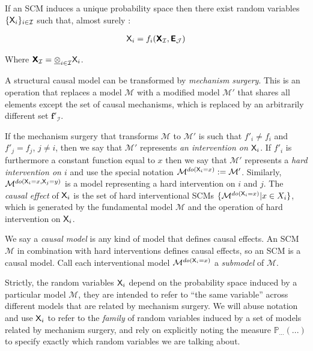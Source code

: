 If an SCM induces a unique probability space then there exist random variables $\{\mathsf{X}_i\}_{i\in\mathcal{I}}$ such that, almost surely \citet{bongers_theoretical_2016}:

\begin{align}
	\mathsf{X}_i = f_i(\bm{\mathsf{X}}_{\mathcal{I}},\bm{\mathsf{E}}_{\mathcal{J}})
\end{align}

Where $\bm{\mathsf{X}}_{\mathcal{I}} = \underline{\otimes}_{i\in \mathcal{I}} \mathsf{X}_i$.

A structural causal model can be transformed by \emph{mechanism surgery}. This is an operation that replaces a model $\mathcal{M}$ with a modified model $\mathcal{M}'$ that shares all elements except the set of causal mechanisms, which is replaced by an arbitrarily different set $\mathbf{f}'_{\mathcal{I}}$.

If the mechanism surgery that transforms $\mathcal{M}$ to $\mathcal{M}'$ is such that $f'_i\neq f_i$ and $f'_j=f_j$, $j\neq i$, then we say that $\mathcal{M}'$ represents \emph{an intervention on $\mathsf{X}_i$}. If $f'_i$ is furthermore a constant function equal to $x$ then we say that $\mathcal{M}'$ represents a \emph{hard intervention on $i$} and use the special notation $\mathcal{M}^{do(\mathsf{X}_i=x)}:=\mathcal{M}'$. Similarly, $\mathcal{M}^{do(\mathsf{X}_i=x,\mathsf{X}_j=y)}$ is a model representing a hard intervention on $i$ and $j$. The \emph{causal effect} of $\mathsf{X}_i$ is the set of hard interventional SCMs $\{\mathcal{M}^{do(\mathsf{X}_i=x)}|x\in X_i\}$, which is generated by the fundamental model $\mathcal{M}$ and the operation of hard intervention on $\mathsf{X}_i$.

We say a \emph{causal model} is any kind of model that defines causal effects. An SCM $\mathcal{M}$ in combination with hard interventions defines causal effects, so an SCM is a causal model. Call each interventional model $\mathcal{M}^{do(\mathsf{X}_i=x)}$ a \emph{submodel} of $\mathcal{M}$.

Strictly, the random variables $\mathsf{X}_i$ depend on the probability space induced by a particular model $\mathcal{M}$, they are intended to refer to ``the same variable'' across different models that are related by mechanism surgery. We will abuse notation and use $\mathsf{X}_i$ to refer to the \emph{family} of random variables induced by a set of models related by mechanism surgery, and rely on explicitly noting the measure $\mathbb{P}_{...}(...)$ to specify exactly which random variables we are talking about. 

